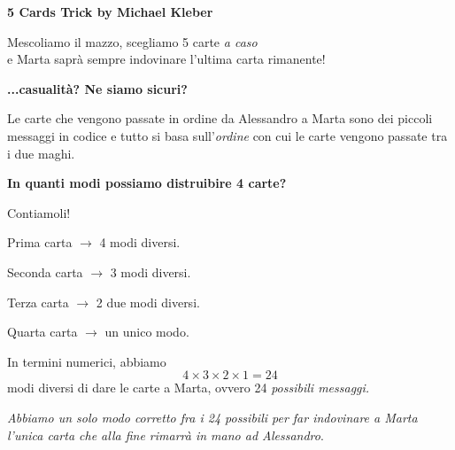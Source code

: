 \documentclass[8pt]{beamer}
\theoremstyle{plain}
\theoremstyle{definition}
\begin{document}
% 
% 

\begin{frame}
\begin{center} \textbf{5 Cards Trick by Michael Kleber} \end{center}
\end{frame}

\begin{frame}
\begin{center} Mescoliamo il mazzo, scegliamo 5 carte \emph{a caso} \\e Marta saprà sempre indovinare l'ultima carta rimanente!

% 
% 

\bigskip
\bigskip

\textbf{...casualità? Ne siamo sicuri?}
\end{center}
\end{frame}

\begin{frame}
\begin{center}
Le carte che vengono passate in ordine da Alessandro a Marta sono dei piccoli messaggi in codice e tutto si basa sull'\emph{ordine} con cui le carte vengono passate tra i due maghi.

\bigskip

\textbf{In quanti modi possiamo distruibire 4 carte?}

\bigskip

Contiamoli!

\smallskip

Prima carta $\rightarrow$ 4 modi diversi. 

Seconda carta $\rightarrow$ 3 modi diversi.

Terza carta $\rightarrow$ 2 due modi diversi.

Quarta carta $\rightarrow$ un unico modo.

\smallskip

In termini numerici, abbiamo $$4\times 3\times 2\times 1=24$$ 
modi diversi di dare le carte a Marta, ovvero 24 \emph{possibili messaggi.}

\smallskip

\emph{Abbiamo un solo modo corretto fra i 24 possibili per far indovinare a Marta \\l'unica carta che alla fine rimarrà in mano ad Alessandro}.
\end{center}
\end{frame}
\end{document}
